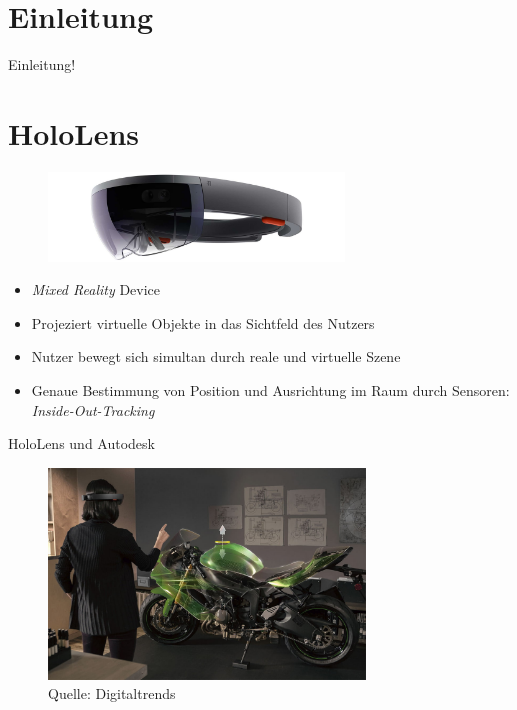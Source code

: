 \part{Einleitung}
\label{part:intro}

\begin{frame}[fragile]{}
Einleitung!
\end{frame}

\part{HoloLens}
\label{part:hololens}
\begin{frame}[fragile]{}
\begin{figure}[h!]
	\centering
	\includegraphics[width=0.7\textwidth]{images/hololens.jpg}
\end{figure}
\begin{itemize}
	\pause
	\item \textit{Mixed Reality} Device
	\pause
	\item Projeziert virtuelle Objekte in das Sichtfeld des Nutzers
	\pause
	\item Nutzer bewegt sich simultan durch reale und virtuelle Szene
	\pause
	\item Genaue Bestimmung von Position und Ausrichtung im Raum durch Sensoren: \textit{Inside-Out-Tracking}
\end{itemize}	
\end{frame}

\begin{frame}[fragile]{HoloLens und Autodesk}
\begin{figure}[h!]
	\centering
	\includegraphics[width=0.75\textwidth]{images/HoloLens_Motorcycle.jpg}
	\setlength{\abovecaptionskip}{5pt plus 5pt minus 2pt}
	\caption*{Quelle: Digitaltrends}
\end{figure}
\end{frame}

